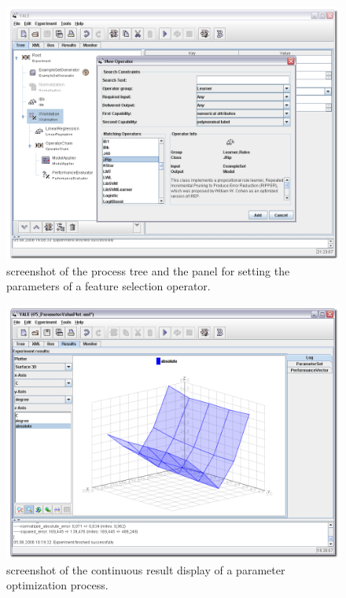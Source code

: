 \begin{figure}[ptbh]
  \center
    \includegraphics[height=0.4\textheight]{graphics/screenshots/screenshot_main1.png}
  \caption[\rapidminer GUI screenshot]{\rapidminer screenshot of the process tree and the panel for setting 
    the parameters of a feature selection operator.}
  \label{fig:screen_experiment}
\end{figure}

\begin{figure}[ptbh]
  \center
    \includegraphics[height=0.4\textheight]{graphics/screenshots/screenshot_main2.png}
  \caption[Parameter optimization process screenshot]{\rapidminer screenshot of the continuous result display
    of a parameter optimization process.}
  \label{fig:screen_plot}
\end{figure}



